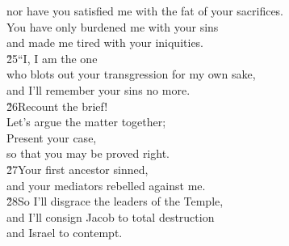 \begin{poetry}
\poemll    nor have you satisfied me with the fat of your sacrifices. \\
\poeml You have only burdened me with your sins \\
\poemll    and made me tired with your iniquities. \\
\poeml \v{25}``I, I am the one \\
\poemll    who blots out your transgression for my own sake, \\
\poemlll       and I'll remember your sins no more. \\
\poeml \v{26}Recount the brief! \\
\poemll    Let's argue the matter together; \\
\poeml Present your case, \\
\poemll    so that you may be proved right. \\
\poeml \v{27}Your first ancestor sinned, \\
\poemll    and your mediators rebelled against me. \\
\poeml \v{28}So I'll disgrace the leaders of the Temple, \\
\poemll    and I'll consign Jacob to total destruction \\
\poemlll       and Israel to contempt.
\end{poetry}

